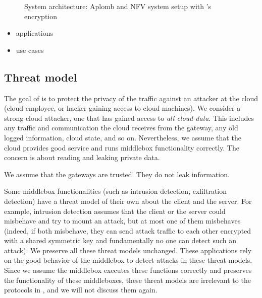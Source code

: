 \begin{figure}[t!]
\centering
{}
%
\vfill  
{}
%
\caption{System architecture: Aplomb and NFV system setup with \sys's encryption \label{fig:sys-overview}}
\end{figure}

\begin{itemize}
\item applications
\item use cases
\end{itemize}

\subsection{Threat model}

The goal of \sys is to protect the privacy of the traffic against an attacker at the cloud 
(cloud employee, or hacker gaining access to cloud machines). 
We consider a strong cloud attacker, one that has gained access to {\em all cloud data}.
This includes any traffic and communication the cloud receives from the 
gateway, any old logged information, cloud state, and so on. Nevertheless, we assume that 
the cloud provides good service and runs middlebox functionality correctly.  The concern is
about reading and leaking private data. 

We assume that the gateways are trusted. They do not leak information.


Some middlebox functionalities (such as intrusion detection, exfiltration detection) have a threat model
of their own about the client and the server. For example, intrusion detection assumes that 
the client or the server could misbehave and try to mount an attack, but at most one of them misbehaves 
(indeed, if both misbehave, they can send attack traffic to each other encrypted with a shared symmetric key and fundamentally
no one can detect such an attack).  We preserve all these threat models unchanged. These applications rely
on the good behavior of the middlebox to detect attacks in these threat models. Since we assume the middlebox executes
these functions correctly and \sys preserves the functionality of these middleboxes, 
these threat models are irrelevant to the protocols in \sys, and we will not discuss them again. 



